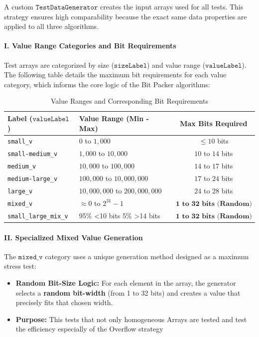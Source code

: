 \documentclass[11pt, a4paper]{article}
\begin{document}
	A custom $\texttt{TestDataGenerator}$ creates the input arrays used for all tests. This strategy ensures high comparability because the exact same data properties are applied to all three algorithms.
	
	\paragraph{I. Value Range Categories and Bit Requirements}
	Test arrays are categorized by size ($\texttt{sizeLabel}$) and value range ($\texttt{valueLabel}$). The following table details the maximum bit requirements for each value category, which informs the core logic of the Bit Packer algorithms:
	
	\begin{table}[H]
		\centering
		\caption{Value Ranges and Corresponding Bit Requirements}
		\label{tab:value_ranges}
		\begin{tabular}{|l|l|c|}
			\hline
			\textbf{Label ($\texttt{valueLabel}$)} & \textbf{Value Range (Min - Max)} & \textbf{Max Bits Required} \\
			\hline
			\texttt{small\_v} & $0$ to $1,000$ & $\le 10$ bits \\
			\texttt{small-medium\_v} & $1,000$ to $10,000$ & $10$ to $14$ bits \\
			\texttt{medium\_v} & $10,000$ to $100,000$ & $14$ to $17$ bits \\
			\texttt{medium-large\_v} & $100,000$ to $10,000,000$ & $17$ to $24$ bits \\
			\texttt{large\_v} & $10,000,000$ to $200,000,000$ & $24$ to $28$ bits \\
			\hline
			\texttt{mixed\_v} & $\approx 0$ to $2^{31}-1$ & $\mathbf{1 \text{ to } 32 \text{ bits (Random)}}$ \\
			\texttt{small\_large\_mix\_v} & 95\% <10 bits 5\% >14 bits & $\mathbf{1 \text{ to } 32 \text{ bits (Random)}}$ \\
			\hline
		\end{tabular}
	\end{table}
	
	\paragraph{II. Specialized Mixed Value Generation}
	The $\texttt{mixed\_v}$ category uses a unique generation method designed as a maximum stress test:
	\begin{itemize}
		\item \textbf{Random Bit-Size Logic:} For each element in the array, the generator selects a \textbf{random bit-width} (from 1 to 32 bits) and creates a value that precisely fits that chosen width.
		\item \textbf{Purpose:} This tests that not only homogeneous Arrays are tested and test the efficiency especially of the Overflow strategy
	\end{itemize}
	
\end{document}
